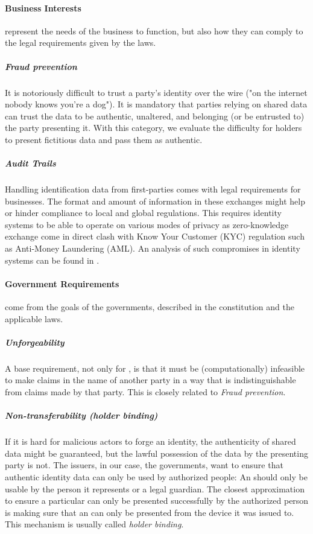 \paragraph{Business Interests} represent the needs of the business to function, but also how they can comply to the legal requirements given by the laws.

\subparagraph{Fraud prevention} It is notoriously difficult to trust a party's identity over the wire ("on the internet nobody knows you're a dog"). It is mandatory that parties relying on shared data can trust the data to be authentic, unaltered, and belonging (or be entrusted to) the party presenting it. With this category, we evaluate the difficulty for holders to present fictitious data and pass them as authentic.

\subparagraph{Audit Trails} Handling identification data from first-parties comes with legal requirements for businesses. The format and amount of information in these exchanges might help or hinder compliance to local and global regulations. This requires identity systems to be able to operate on various modes of privacy as zero-knowledge exchange come in direct clash with Know Your Customer (KYC) regulation such as Anti-Money Laundering (AML). An analysis of such compromises in identity systems can be found in \cite{ABCD25}.

\paragraph{Government Requirements} come from the goals of the governments, described in the constitution and the applicable laws.

\subparagraph{Unforgeability} A base requirement, not only for \eid, is that it must be (computationally) infeasible to make claims in the name of another party in a way that is indistinguishable from claims made by that party. This is closely related to \emph{Fraud prevention}.

\subparagraph{Non-transferability (holder binding)} If it is hard for malicious actors to forge an identity, the authenticity of shared data might be guaranteed, but the lawful possession of the data by the presenting party is not. The issuers, in our case, the governments, want to ensure that authentic identity data can only be used by authorized people: An \eid should only be usable by the person it represents or a legal guardian. The closest approximation to ensure a particular \eid can only be presented successfully by the authorized person is making sure that an \eid can only be presented from the device it was issued to. This mechanism is usually called \emph{holder binding}.

